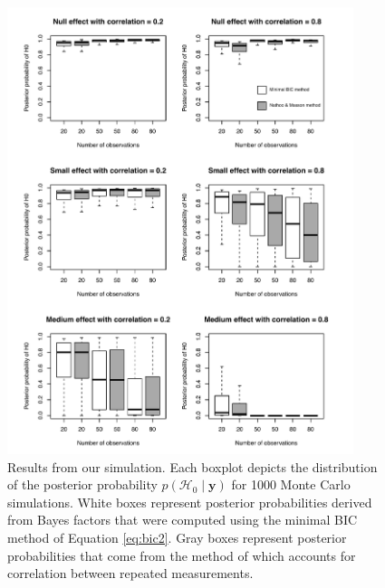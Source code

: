 \documentclass[12pt,twoside,a4paper]{article}
\begin{document}
\begin{figure}
  \centering
  \includegraphics[width=0.9\textwidth]{dist.pdf}
  \caption{Results from our simulation. Each boxplot depicts the distribution of the posterior probability $p(\mathcal{H}_0\mid \bm{y})$ for 1000 Monte Carlo simulations. White boxes represent posterior probabilities derived from Bayes factors that were computed using the minimal BIC method of Equation \ref{eq:bic2}. Gray boxes represent posterior probabilities that come from the method of \citet{nathoo2016} which accounts for correlation between repeated measurements. }
  \label{fig:dist}
\end{figure}
\end{document}
